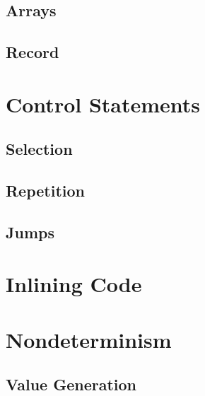 \documentclass[a4paper, 11pt, accentcolor = tud3b]{tudreport}
\begin{document}
            \subsection{Arrays} %

            \subsection{Record} %

        \section{Control Statements} %

            \subsection{Selection} %

            \subsection{Repetition} %

            \subsection{Jumps} %

        \section{Inlining Code} %

        \section{Nondeterminism} %

            \subsection{Value Generation} %
\end{document}
